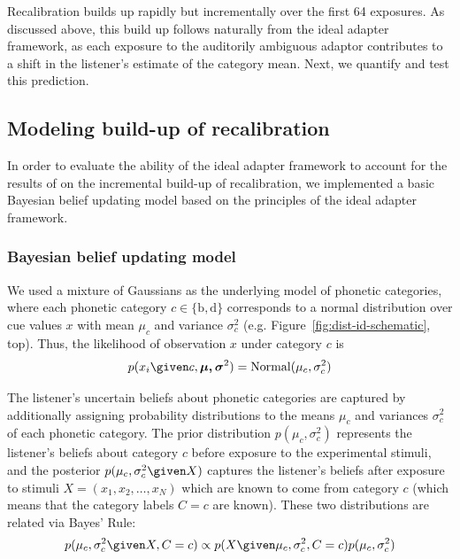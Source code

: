 Recalibration builds up rapidly but incrementally over the first 64 exposures.  As discussed above, this build up follows naturally from the ideal adapter framework, as each exposure to the auditorily ambiguous adaptor contributes to a shift in the listener's estimate of the category mean.
Next, we quantify and test this prediction.


\subsection{Modeling build-up of recalibration}
\label{sec:modeling-build-up}

In order to evaluate the ability of the ideal adapter framework to account for the results of \textcite{Vroomen2007} on the incremental build-up of recalibration, we implemented a basic Bayesian belief updating model based on the principles of the ideal adapter framework.

\subsubsection{Bayesian belief updating model}
\label{sec:bayes-beli-updat}

We used a mixture of Gaussians as the underlying model of phonetic categories, where each phonetic category $c \in \{\mathrm b, \mathrm d\}$ corresponds to a normal distribution over cue values $x$ with mean $\mu_c$ and variance $\sigma^2_c$ (e.g. Figure~\ref{fig:dist-id-schematic}, top).  Thus, the likelihood of observation $x$ under category $c$ is
\begin{equation}
  \label{eq:4}
  p(x_i \given c, \boldsymbol{\mu, \sigma}^2) = \mathrm{Normal} (\mu_{c}, \sigma^2_{c})
\end{equation}

The listener's uncertain beliefs about phonetic categories are captured by additionally assigning probability distributions to the means $\mu_c$ and variances $\sigma^2_c$ of each phonetic category.  The prior distribution $p(\mu_c, \sigma^2_c)$ represents the listener's beliefs about category $c$ before exposure to the experimental stimuli, and the posterior $p(\mu_c, \sigma^2_c \given X)$ captures the listener's beliefs after exposure to stimuli $X = (x_1, x_2, \ldots, x_N)$ which are known to come from category $c$ (which means that the category labels $C=c$ are known).  These two distributions are related via Bayes' Rule:
\begin{equation}
  \label{eq:5}
  p(\mu_c, \sigma^2_c \given X, C=c) \propto p(X\given \mu_c, \sigma^2_c, C=c) p(\mu_c, \sigma^2_c)
\end{equation}


